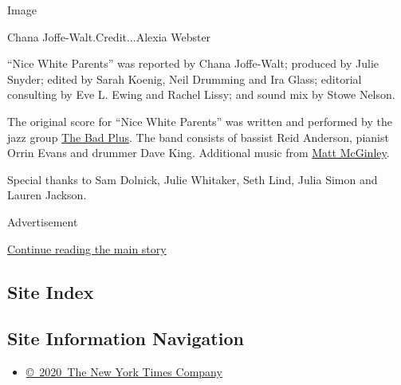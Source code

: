 Image

Chana Joffe-Walt.Credit...Alexia Webster

``Nice White Parents'' was reported by Chana Joffe-Walt; produced by
Julie Snyder; edited by Sarah Koenig, Neil Drumming and Ira Glass;
editorial consulting by Eve L. Ewing and Rachel Lissy; and sound mix by
Stowe Nelson.

The original score for ``Nice White Parents'' was written and performed
by the jazz group \href{https://www.thebadplus.com/}{The Bad Plus}. The
band consists of bassist Reid Anderson, pianist Orrin Evans and drummer
Dave King. Additional music from
\href{https://music.apple.com/album/1527988266?app=itunes\&ls=1}{Matt
McGinley}.

Special thanks to Sam Dolnick, Julie Whitaker, Seth Lind, Julia Simon
and Lauren Jackson.

Advertisement

\protect\hyperlink{after-bottom}{Continue reading the main story}

\hypertarget{site-index}{%
\subsection{Site Index}\label{site-index}}

\hypertarget{site-information-navigation}{%
\subsection{Site Information
Navigation}\label{site-information-navigation}}

\begin{itemize}
\tightlist
\item
  \href{https://help.nytimes3xbfgragh.onion/hc/en-us/articles/115014792127-Copyright-notice}{©~2020~The
  New York Times Company}
\end{itemize}

